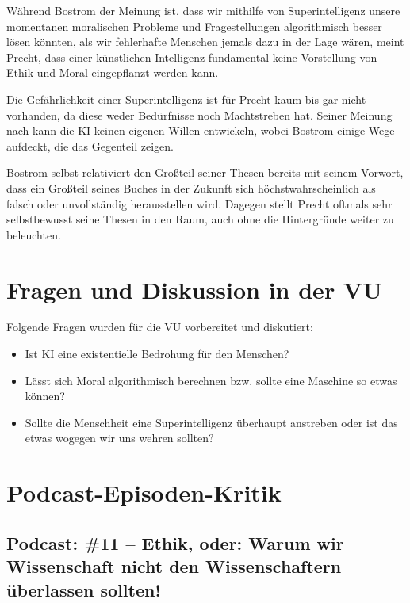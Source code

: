 \documentclass[twoside, a4paper, DIV=11, open=any, bibliography=totoc]{scrbook}
\begin{document}
Während Bostrom der Meinung ist, dass wir mithilfe von Superintelligenz unsere momentanen moralischen
Probleme und Fragestellungen algorithmisch besser lösen könnten, als wir fehlerhafte Menschen jemals dazu
in der Lage wären, meint Precht, dass einer künstlichen Intelligenz fundamental keine Vorstellung von
Ethik und Moral eingepflanzt werden kann.

Die Gefährlichkeit einer Superintelligenz ist für Precht kaum bis gar nicht vorhanden, da diese weder Bedürfnisse noch Machtstreben hat. Seiner Meinung nach kann die KI keinen eigenen Willen entwickeln, wobei Bostrom einige Wege aufdeckt, die das Gegenteil zeigen. 

Bostrom selbst relativiert den Großteil seiner Thesen bereits mit seinem Vorwort, dass ein Großteil seines
Buches in der Zukunft sich höchstwahrscheinlich als falsch oder unvollständig herausstellen wird.
Dagegen stellt Precht oftmals sehr selbstbewusst seine Thesen in den Raum, auch ohne die Hintergründe
weiter zu beleuchten.

\chapter{Fragen und Diskussion in der VU} \label{sec:fragenvu}

Folgende Fragen wurden für die VU vorbereitet und diskutiert:

\begin{itemize}
    \item Ist KI eine existentielle Bedrohung für den Menschen? 
    \item Lässt sich Moral algorithmisch berechnen bzw. sollte eine Maschine so etwas können? 
    \item Sollte die Menschheit eine Superintelligenz überhaupt anstreben oder ist das etwas wogegen wir uns wehren sollten?
\end{itemize}




\chapter{Podcast-Episoden-Kritik} \label{chap:podkrit}


\section{Podcast: \#11 -- Ethik, oder: Warum wir Wissenschaft nicht den Wissenschaftern überlassen sollten!}
\end{document}
